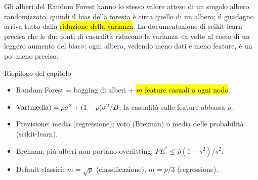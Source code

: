\begin{mlbox}
Gli alberi del Random Forest hanno lo stesso valore atteso di un singolo albero randomizzato, quindi il bias della foresta è circa quello di un albero; il guadagno arriva tutto dalla \hl{riduzione della varianza}. La documentazione di scikit-learn precisa che le due fonti di casualità riducono la varianza «a volte al costo di un leggero aumento del bias»: ogni albero, vedendo meno dati e meno feature, è un po' meno preciso.
\end{mlbox}

\begin{appunti}{Riepilogo del capitolo}
\begin{itemize}
  \item Random Forest = bagging di alberi + \hl{$m$ feature casuali a ogni nodo}.
  \item $\operatorname{Var}(\text{media})=\rho\sigma^2+(1-\rho)\sigma^2/B$: la casualità sulle feature abbassa $\rho$.
  \item Previsione: media (regressione); voto (Breiman) o media delle probabilità (scikit-learn).
  \item Breiman: più alberi non portano overfitting; $PE^*\le\bar\rho(1-s^2)/s^2$.
  \item Default classici: $m=\sqrt p$ (classificazione), $m=p/3$ (regressione).
\end{itemize}
\end{appunti}
